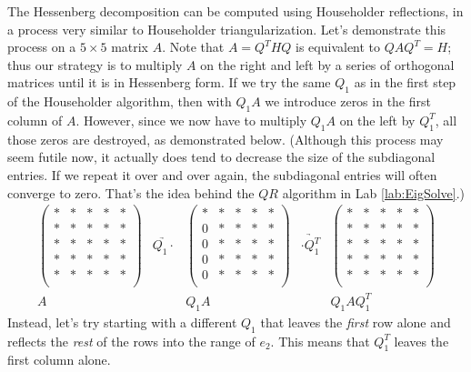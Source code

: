 The Hessenberg decomposition can be computed using Householder reflections, in a process very similar to Householder triangularization. 
Let's demonstrate this process on a $5 \times 5$ matrix $A$. 
Note that $A=Q^THQ$ is equivalent to $QAQ^T = H$; thus our strategy is to multiply $A$ on the right and left by a series of orthogonal matrices until it is in Hessenberg form. 
If we try the same $Q_1$ as in the first step of the Householder algorithm, then with $Q_1 A$ we introduce zeros in the first column of $A$. 
However, since we now have to multiply $Q_1 A$ on the left by $Q_1^T$, all those zeros are destroyed, as demonstrated below. 
(Although this process may seem futile now, it actually does tend to decrease the size of the subdiagonal entries. 
If we repeat it over and over again, the subdiagonal entries will often converge to zero. 
That's the idea behind the $QR$ algorithm in Lab \ref{lab:EigSolve}.)
\[
\begin{array}{ccccc} 
\begin{pmatrix}
* & * & * & * & *\\
* & * & * & * & *\\
* & * & * & * & *\\
* & * & * & * & *\\
* & * & * & * & *\\
\end{pmatrix} 
&\underrightarrow{Q_1 \cdot }&
\begin{pmatrix}
* & * & * & * & *\\
0 & * & * & * & *\\
0 & * & * & * & *\\
0 & * & * & * & *\\
0 & * & * & * & *\\
\end{pmatrix} 
&\underrightarrow{\cdot Q_1^T }&
\begin{pmatrix}
* & * & * & * & *\\
* & * & * & * & *\\
* & * & * & * & *\\
* & * & * & * & *\\
* & * & * & * & *\\
\end{pmatrix} 
\\ 
A & & Q_1A & & Q_1 A Q_1^T
  \end{array}
\]
Instead, let's try starting with a different $Q_1$ that leaves the \emph{first} row alone and reflects the \emph{rest} 
of the rows into the range of $e_2$. This means that $Q_1^T$ leaves the first column alone.

